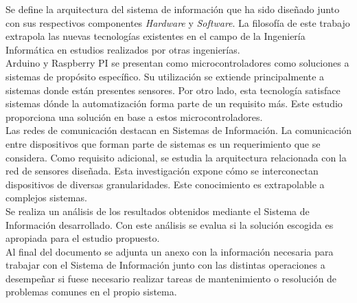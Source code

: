 Se define la arquitectura del sistema de información que ha sido diseñado junto con sus respectivos componentes \textit{Hardware} y \textit{Software}. La filosofía de este trabajo extrapola las nuevas tecnologías existentes en el campo de la Ingeniería Informática en estudios realizados por otras ingenierías.\\

Arduino y Raspberry PI se presentan como microcontroladores como soluciones a sistemas de propósito específico. Su utilización se extiende principalmente a sistemas donde están presentes sensores. Por otro lado, esta tecnología satisface sistemas dónde la automatización forma parte de un requisito más. Este estudio proporciona una solución en base a estos microcontroladores.\\

Las redes de comunicación destacan en Sistemas de Información. La comunicación entre dispositivos que forman parte de sistemas es un requerimiento que se considera. Como requisito adicional, se estudia la arquitectura relacionada con la red de sensores diseñada. Esta investigación expone cómo se interconectan dispositivos de diversas granularidades. Este conocimiento es extrapolable a complejos sistemas.\\

Se realiza un análisis de los resultados obtenidos mediante el Sistema de Información desarrollado. Con este análisis se evalua si la solución escogida es apropiada para el estudio propuesto.\\

Al final del documento se adjunta un anexo con la información necesaria para trabajar con el Sistema de Información junto con las distintas operaciones a desempeñar si fuese necesario realizar tareas de mantenimiento o resolución de problemas comunes en el propio sistema.


\thispagestyle{empty}

\newpage
\newpage
